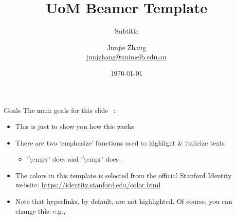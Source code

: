 \documentclass[pdf]{beamer} %
\title[In the footer]{UoM Beamer Template}
\subtitle{Subtitle}
\begin{document}
\author[J. Zhang, The University of Melbourne]{
	\begin{tabular}{c} 
		\Large Junjie Zhang\\
    \footnotesize \href{mailto:junjzhang@unimelb.edu.au}{junjzhang@unimelb.edu.au}
	\end{tabular}
\vspace{-2ex}}


\date{\today}

\begin{noheadline}
\begin{frame}\vspace{-1.8cm}\maketitle\end{frame}
\end{noheadline}



\begin{frame}{Goals}
The main goals for this slide~\autocite{allis:91} :
\begin{itemize}
	\item This is just to show you how this  works
	\item There are two `emphasize' functions used to highlight \& italicize texts
	\begin{itemize}
		\item `\textbackslash empy' does  and `\textbackslash empr' does .
	\end{itemize}
	\item The colors in this template is selected from the official Stanford Identity website: \href{https://identity.stanford.edu/color.html}{https://identity.stanford.edu/color.html}
	\item Note that hyperlinks, by default, are not highlighted. Of course, you can change this: e.g., 
\end{itemize}
\end{frame}
\end{document}
